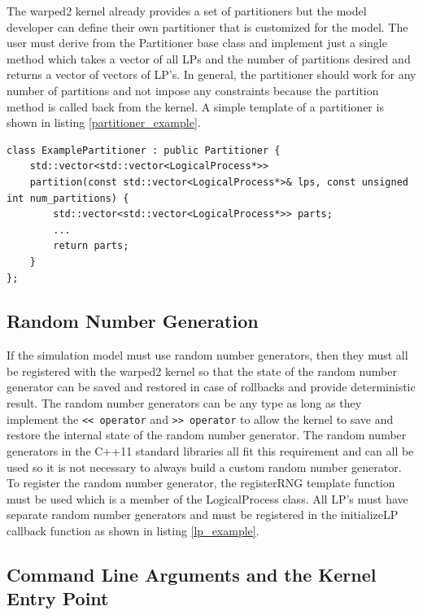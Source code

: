\documentclass[11pt]{book}
\begin{document}
The warped2 kernel already provides a set of partitioners but the model developer can define
their own partitioner that is customized for the model. The user must derive from the Partitioner
base class and implement just a single method which takes a vector of all LPs and the number of
partitions desired and returns a vector of vectors of LP's. In general, the partitioner should
work for any number of partitions and not impose any constraints because the partition method
is called back from the kernel. A simple template of a partitioner is shown in listing
\ref{partitioner_example}.

\begin{lstlisting}[caption=Example \textsc{warped2} Partitioner Definition, label=partitioner_example, float]
class ExamplePartitioner : public Partitioner {
    std::vector<std::vector<LogicalProcess*>>
    partition(const std::vector<LogicalProcess*>& lps, const unsigned int num_partitions) {
        std::vector<std::vector<LogicalProcess*>> parts;
        ...
        return parts;
    }
};
\end{lstlisting}

\subsection{Random Number Generation}

If the simulation model must use random number generators, then they must all be registered
with the warped2 kernel so that the state of the random number generator can be saved and
restored in case of rollbacks and provide deterministic result. The random number generators
can be any type as long as they implement the \texttt{<< operator} and \texttt{>> operator} to
allow the kernel to save and restore the internal state of the random number generator. The
random number generators in the C++11 standard libraries\cite{c++11-rng} all fit this requirement
and can all be used so it is not necessary to always build a custom random number generator. To
register the random number generator, the registerRNG template function must be used which is
a member of the LogicalProcess class. All LP's must have separate random number generators and
must be registered in the initializeLP callback function as shown in listing \ref{lp_example}.

\subsection{Command Line Arguments and the Kernel Entry Point}
\end{document}
